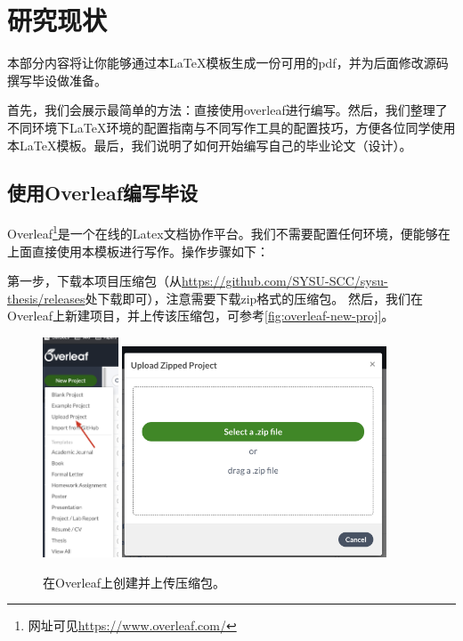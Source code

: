 \chapter{研究现状}


\label{cha:sysu-thesis-latex-install-guide}

本部分内容将让你能够通过本\LaTeX 模板生成一份可用的pdf，并为后面修改源码撰写毕设做准备。

首先，我们会展示最简单的方法：直接使用overleaf进行编写。然后，我们整理了不同环境下\LaTeX 环境的配置指南与不同写作工具的配置技巧，方便各位同学使用本\LaTeX 模板。最后，我们说明了如何开始编写自己的毕业论文（设计）。


\section{使用Overleaf编写毕设}

Overleaf\footnote{网址可见\url{https://www.overleaf.com/}}是一个在线的Latex文档协作平台。我们不需要配置任何环境，便能够在上面直接使用本模板进行写作。操作步骤如下：

第一步，下载本项目压缩包（从\url{https://github.com/SYSU-SCC/sysu-thesis/releases}处下载即可），注意需要下载zip格式的压缩包。
然后，我们在Overleaf上新建项目，并上传该压缩包，可参考\autoref{fig:overleaf-new-proj}。


\begin{figure}[h]
	\centering
	\includegraphics[width=0.2\textwidth]{image/chap03/overleaf-create-proj.jpg}
	\includegraphics[width=0.7\textwidth]{image/chap03/overleaf-upload-proj.jpg}
	\caption{在Overleaf上创建并上传压缩包。}
 	\label{fig:overleaf-new-proj}
\end{figure}

